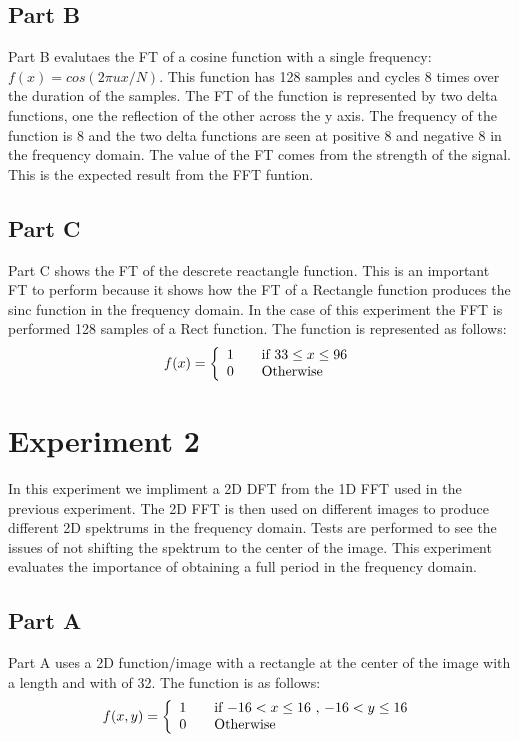 \documentclass[letter]{article}
\begin{document}
\subsection{Part B}
Part B evalutaes the FT of a cosine function with a single frequency: $f(x) = cos(2 \pi u x / N)$. This function has 128 samples and cycles 8 times over the duration of the samples. The FT of the function is represented by two delta functions, one the reflection of the other across the y axis. The frequency of the function is 8 and the two delta functions are seen at positive 8 and negative 8 in the frequency domain. The value of the FT comes from the strength of the signal. This is the expected result from the FFT funtion. 
\subsection{Part C}
Part C shows the FT of the descrete reactangle function. This is an important FT to perform because it shows how the FT of a Rectangle function produces the sinc function in the frequency domain. In the case of this experiment the FFT is performed 128 samples of a Rect function. The function is represented as follows: $$f(x) = \left \{ \begin{array}{l l} 1 & \quad \text{if $33 \leq x \leq 96$}\\ 0 & \quad \text{Otherwise}\end{array} \right.$$
\section{Experiment 2}
In this experiment we impliment a 2D DFT from the 1D FFT used in the previous experiment. The 2D FFT is then used on different images to produce different 2D spektrums in the frequency domain. Tests are performed to see the issues of not shifting the spektrum to the center of the image. This experiment evaluates the importance of obtaining a full period in the frequency domain.
\subsection{Part A}
Part A uses a 2D function/image with a rectangle at the center of the image with a length and with of 32. The function is as follows: $$f(x,y) = \left \{ \begin{array}{l l} 1 & \quad \text{if $-16 < x \leq 16$ , $-16 < y \leq 16$}\\ 0 & \quad \text{Otherwise}\end{array} \right.$$
\end{document}
